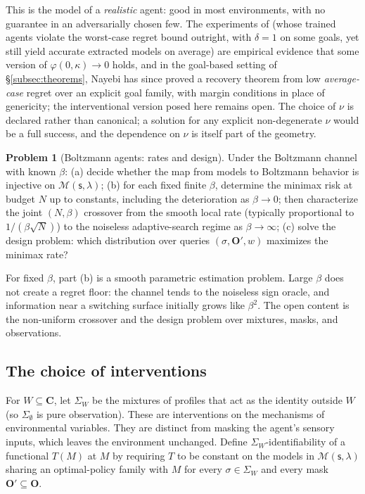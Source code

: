 \documentclass[11pt]{amsart}
\theoremstyle{plain}
\theoremstyle{definition}
\newtheorem{problem}[theorem]{Problem}
\newcommand{\bC}{\mathbf{C}}
\newcommand{\bO}{\mathbf{O}}
\newcommand{\MM}{\mathcal{M}}
\newcommand{\sk}{\mathsf{s}}
\begin{document}
This is the model of a \emph{realistic} agent: good in most environments, with no guarantee in an adversarially chosen few. The experiments of \cite{richens2025} (whose trained agents violate the worst-case regret bound outright, with $\delta=1$ on some goals, yet still yield accurate extracted models on average) are empirical evidence that some version of $\varphi(0,\kappa)\to0$ holds, and in the goal-based setting of \S\ref{subsec:theorems}, Nayebi \cite{nayebi2026} has since proved a recovery theorem from low \emph{average-case} regret over an explicit goal family, with margin conditions in place of genericity; the interventional version posed here remains open. The choice of $\nu$ is declared rather than canonical; a solution for any explicit non-degenerate $\nu$ would be a full success, and the dependence on $\nu$ is itself part of the geometry.

\begin{problem}[Boltzmann agents: rates and design]\label{prob:boltzmann}
Under the Boltzmann channel with known $\beta$: (a) decide whether the map from models to Boltzmann behavior is injective on $\MM(\sk,\lambda)$; (b) for each fixed finite $\beta$, determine the minimax risk at budget $N$ up to constants, including the deterioration as $\beta\to0$; then characterize the joint $(N,\beta)$ crossover from the smooth local rate (typically proportional to $1/(\beta\sqrt N)$) to the noiseless adaptive-search regime as $\beta\to\infty$; (c) solve the design problem: which distribution over queries $(\sigma,\bO',w)$ maximizes the minimax rate?
\end{problem}

For fixed $\beta$, part (b) is a smooth parametric estimation problem. Large $\beta$ does not create a regret floor: the channel tends to the noiseless sign oracle, and information near a switching surface initially grows like $\beta^2$. The open content is the non-uniform crossover and the design problem over mixtures, masks, and observations.

\subsection{The choice of interventions}

For $W\subseteq\bC$, let $\Sigma_W$ be the mixtures of profiles that act as the identity outside $W$ (so $\Sigma_\emptyset$ is pure observation). These are interventions on the mechanisms of environmental variables. They are distinct from masking the agent's sensory inputs, which leaves the environment unchanged. Define $\Sigma_W$-identifiability of a functional $T(M)$ at $M$ by requiring $T$ to be constant on the models in $\MM(\sk,\lambda)$ sharing an optimal-policy family with $M$ for every $\sigma\in\Sigma_W$ and every mask $\bO'\subseteq\bO$.
\end{document}

